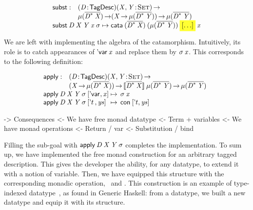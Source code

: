 \[\stk{
\begin{array}{@{}ll}
\subst : & \PITEL{\V{D}}{\TagDesc}
           \PI{\V{X}, \V{Y}}{\Set} \\
         & \Mu{(\toDesc{\FreeMonad{\V{D}}{\V{X}}})} \To
           (\V{X} \To \Mu{(\toDesc{\FreeMonad{\V{D}}{\V{Y}}})}) \To
           \Mu{(\toDesc{\FreeMonad{\V{D}}{\V{Y}}})} 
\end{array} \\
\subst\: \V{D}\: \V{X}\: \V{Y}\: \V{x}\: \V{\sigma} \mapsto
  \cata\: (\toDesc{\FreeMonad{\V{D}}{\V{X}}})\: 
          (\Mu{(\toDesc{\FreeMonad{\V{D}}{\V{Y}}})})\: 
          \SHED\: 
          \V{x}
}\]

We are left with implementing the algebra of the
catamorphism. Intuitively, its role is to catch appearances of
$\DVar{\V{x}}$ and replace them by $\V{\sigma}\: \V{x}$. This
corresponds to the following definition:

\[\stk{
\begin{array}{@{}ll}
\apply : & \PITEL{\V{D}}{\TagDesc} 
           \PI{\V{X}, \V{Y}}{\Set} \\
         & (\V{X} \To \Mu{(\toDesc{\FreeMonad{\V{D}}{\V{X}}})}) \To
           \descop{\toDesc{\FreeMonad{\V{D}}{\V{X}}}}{\Mu{(\toDesc{\FreeMonad{\V{D}}{\V{Y}}})}} \To
           \Mu{(\toDesc{\FreeMonad{\V{D}}{\V{Y}}})}
\\
\end{array} \\
\begin{array}{@{}l@{\:\mapsto\:\:}l}
\apply\: \V{D}\: \V{X}\: \V{Y}\: \V{\sigma}\: \pair{\DVar{\!}}{\V{x}}{}   & \V{\sigma}\: \V{x}                   \\
\apply\: \V{D}\: \V{X}\: \V{Y}\: \V{\sigma}\: \pair{\etag{t}\,}{\V{ys}}{} & \Con{\pair{\etag{t}}{\V{ys}}{}}
\end{array}
}\]

\begin{wstructure}
    -> Consequences
        <- We have free monad datatype
            <- Term + variables
        <- We have monad operations
            <- Return / var
            <- Substitution / bind
\end{wstructure}

Filling the sub-goal with $\apply\: \V{D}\: \V{X}\: \V{Y}\:
\V{\sigma}$ completes the implementation. To sum up, we have
implemented the free monad construction for an arbitrary tagged
description. This gives the developer the ability, for any datatype,
to extend it with a notion of variable. Then, we have equipped this
structure with the corresponding monadic operation, \bind\ and
\return. This construction is an example of type-indexed
datatype~\cite{hinze:generic-haskell}, as found in Generic Haskell:
from a datatype, we built a new datatype and equip it with its
structure.

